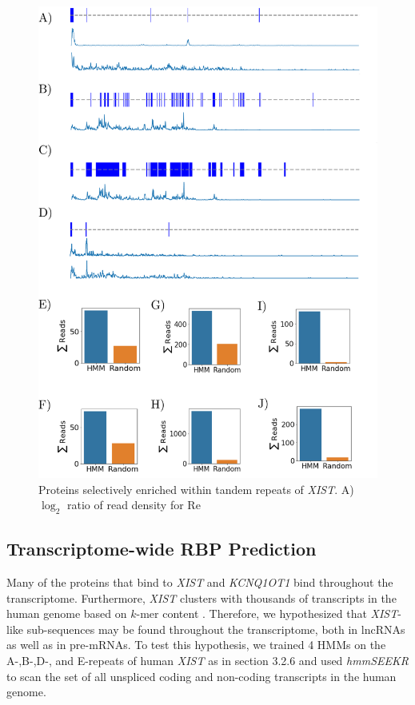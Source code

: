 \begin{figure}[h!]
\centering
\includegraphics[width=.95\textwidth]{images/kcneclip.pdf}
\caption{Proteins selectively enriched within tandem repeats of \emph{XIST}. A) $\log_2$ ratio of read density for Re}
\label{fig:kcnproteins}
\end{figure}


\subsection{Transcriptome-wide RBP Prediction}
Many of the proteins that bind to \emph{XIST} and \emph{KCNQ1OT1} bind throughout the transcriptome. Furthermore, \emph{XIST} clusters with thousands of transcripts in the human genome based on $k$-mer content \cite{Kirk2018FunctionalContent}. Therefore, we hypothesized that \emph{XIST}-like sub-sequences may be found throughout the transcriptome, both in lncRNAs as well as in pre-mRNAs. To test this hypothesis, we trained 4 HMMs on the A-,B-,D-, and E-repeats of human \emph{XIST} as in section 3.2.6 and used \emph{hmmSEEKR} to scan the set of all unspliced coding and non-coding transcripts in the human genome. 

